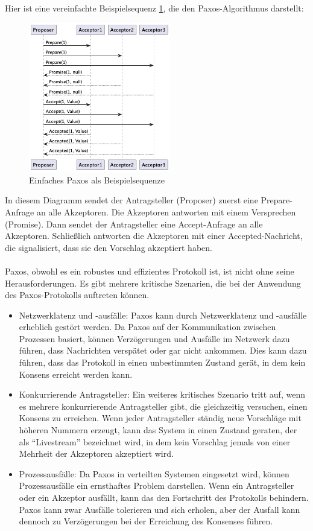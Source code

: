 Hier ist eine vereinfachte Beispielsequenz \ref{fig:simple-paxos}, die den Paxos-Algorithmus darstellt:
\begin{figure}[htp!]
  \centering
  \includegraphics[width=0.55\textwidth]{fig/uml/paxos-default}
  \caption{Einfaches Paxos als Beispielsequenze}
  \label{fig:simple-paxos}
\end{figure}
In diesem Diagramm sendet der Antragsteller (Proposer) zuerst eine Prepare-Anfrage an alle Akzeptoren. Die Akzeptoren antworten mit einem Versprechen (Promise). Dann sendet der Antragsteller eine Accept-Anfrage an alle Akzeptoren. Schließlich antworten die Akzeptoren mit einer Accepted-Nachricht, die signalisiert, dass sie den Vorschlag akzeptiert haben.
\\\\
Paxos, obwohl es ein robustes und effizientes Protokoll ist, ist nicht ohne seine Herausforderungen. Es gibt mehrere kritische Szenarien, die bei der Anwendung des Paxos-Protokolls auftreten können.
\begin{itemize}
\item Netzwerklatenz und -ausfälle: Paxos kann durch Netzwerklatenz und -ausfälle erheblich gestört werden. Da Paxos auf der Kommunikation zwischen Prozessen basiert, können Verzögerungen und Ausfälle im Netzwerk dazu führen, dass Nachrichten verspätet oder gar nicht ankommen. Dies kann dazu führen, dass das Protokoll in einen unbestimmten Zustand gerät, in dem kein Konsens erreicht werden kann.
\item Konkurrierende Antragsteller: Ein weiteres kritisches Szenario tritt auf, wenn es mehrere konkurrierende Antragsteller gibt, die gleichzeitig versuchen, einen Konsens zu erreichen. Wenn jeder Antragsteller ständig neue Vorschläge mit höheren Nummern erzeugt, kann das System in einen Zustand geraten, der als \enquote{Livestream} bezeichnet wird, in dem kein Vorschlag jemals von einer Mehrheit der Akzeptoren akzeptiert wird.
\item Prozessausfälle: Da Paxos in verteilten Systemen eingesetzt wird, können Prozessausfälle ein ernsthaftes Problem darstellen. Wenn ein Antragsteller oder ein Akzeptor ausfällt, kann das den Fortschritt des Protokolls behindern. Paxos kann zwar Ausfälle tolerieren und sich erholen, aber der Ausfall kann dennoch zu Verzögerungen bei der Erreichung des Konsenses führen.
\end{itemize}
